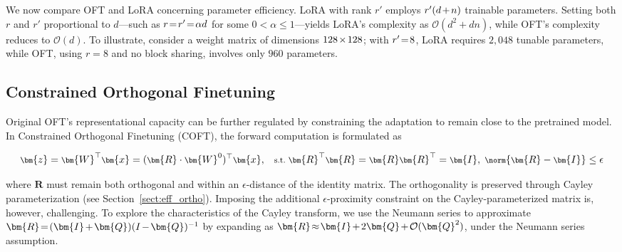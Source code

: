 We now compare OFT and LoRA concerning parameter efficiency. LoRA with rank $r'$ employs $\thickmuskip=2mu \medmuskip=2mu r'(d+n)$ trainable parameters. Setting both $r$ and $r'$ proportional to $d$—such as $\thickmuskip=2mu \medmuskip=2mu r=r'=\alpha d$ for some $0<\alpha\leq 1$—yields LoRA’s complexity as $\mathcal{O}(d^2+dn)$, while OFT’s complexity reduces to $\mathcal{O}(d)$. To illustrate, consider a weight matrix of dimensions $\thickmuskip=2mu \medmuskip=2mu 128\times 128$; with $\thickmuskip=2mu \medmuskip=2mu r'=8$, LoRA requires $2{,}048$ tunable parameters, while OFT, using $r=8$ and no block sharing, involves only $960$ parameters.

\subsection{Constrained Orthogonal Finetuning}

Original OFT’s representational capacity can be further regulated by constraining the adaptation to remain close to the pretrained model. In Constrained Orthogonal Finetuning (COFT), the forward computation is formulated as

\begin{equation}\label{eq:coft_general}
    \footnotesize
    \bm{z}=\bm{W}^\top\bm{x}=(\bm{R}\cdot\bm{W}^0)^\top\bm{x},~~~\text{s.t.}~\bm{R}^\top\bm{R}=\bm{R}\bm{R}^\top=\bm{I},~\norm{\bm{R}-\bm{I}}\leq \epsilon
\end{equation}

where $\bm{R}$ must remain both orthogonal and within an $\epsilon$-distance of the identity matrix. The orthogonality is preserved through Cayley parameterization (see Section~\ref{sect:eff_ortho}). Imposing the additional $\epsilon$-proximity constraint on the Cayley-parameterized matrix is, however, challenging. To explore the characteristics of the Cayley transform, we use the Neumann series to approximate $\thickmuskip=2mu \medmuskip=2mu \bm{R}=(\bm{I}+\bm{Q})(I-\bm{Q})^{-1}$ by expanding as $\thickmuskip=2mu \medmuskip=2mu \bm{R}\approx\bm{I}+2\bm{Q}+\mathcal{O}(\bm{Q}^2)$, under the Neumann series assumption.

